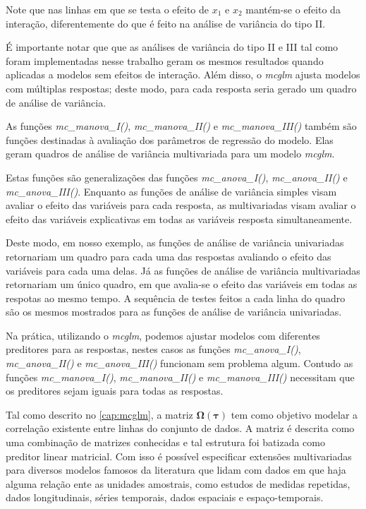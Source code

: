 Note que nas linhas em que se testa o efeito de $x_1$ e $x_2$ mantém-se o efeito da interação, diferentemente do que é feito na análise de variância do tipo II.

É importante notar que que as análises de variância do tipo II e III tal como foram implementadas nesse trabalho geram os mesmos resultados quando aplicadas a modelos sem efeitos de interação. Além disso, o \emph{mcglm} ajusta modelos com múltiplas respostas; deste modo, para cada resposta seria gerado um quadro de análise de variância. 

As funções \emph{mc\_manova\_I()}, \emph{mc\_manova\_II()} e \emph{mc\_manova\_III()} também são funções destinadas à avaliação dos parâmetros de regressão do modelo. Elas geram quadros de análise de variância multivariada para um modelo \emph{mcglm}. 

Estas funções são generalizações das funções \emph{mc\_anova\_I()}, \emph{mc\_anova\_II()} e \emph{mc\_anova\_III()}. Enquanto as funções de análise de variância simples visam avaliar o efeito das variáveis para cada resposta, as multivariadas visam avaliar o efeito das variáveis explicativas em todas as variáveis resposta simultaneamente. 

Deste modo, em nosso exemplo, as funções de análise de variância univariadas retornariam um quadro para cada uma das respostas avaliando o efeito das variáveis para cada uma delas. Já as funções de análise de variância multivariadas retornariam um único quadro, em que avalia-se o efeito das variáveis em todas as respotas ao mesmo tempo. A sequência de testes feitos a cada linha do quadro são os mesmos mostrados para as funções de análise de variância univariadas.

Na prática, utilizando o \emph{mcglm}, podemos ajustar modelos com diferentes preditores para as respostas, nestes casos as funções \emph{mc\_anova\_I()}, \emph{mc\_anova\_II()} e \emph{mc\_anova\_III()} funcionam sem problema algum. Contudo as funções \emph{mc\_manova\_I()}, \emph{mc\_manova\_II()} e \emph{mc\_manova\_III()} necessitam que os preditores sejam iguais para todas as respostas.

Tal como descrito no \autoref{cap:mcglm}, a matriz $\boldsymbol{\Omega({\tau})}$ tem como objetivo modelar a correlação existente entre linhas do conjunto de dados. A matriz é descrita como uma combinação de matrizes conhecidas e tal estrutura foi batizada como preditor linear matricial. Com isso é possível especificar extensões multivariadas para diversos modelos famosos da literatura que lidam com dados em que haja alguma relação ente as unidades amostrais, como estudos de medidas repetidas, dados longitudinais, séries temporais, dados espaciais e espaço-temporais.

